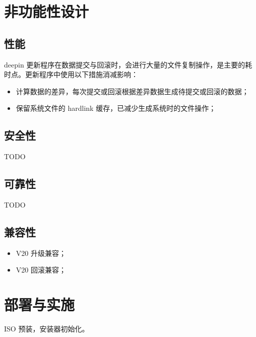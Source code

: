 \documentclass{utart}
\begin{document}
\section{非功能性设计}
\subsection{性能}
deepin 更新程序在数据提交与回滚时，会进行大量的文件复制操作，是主要的耗时点。更新程序中使用以下措施消减影响：
\begin{itemize}[leftmargin=4em]
\item 计算数据的差异，每次提交或回滚根据差异数据生成待提交或回滚的数据；
\item 保留系统文件的 hardlink 缓存，已减少生成系统时的文件操作；
\end{itemize}

\subsection{安全性}
TODO

\subsection{可靠性}
TODO

\subsection{兼容性}
\begin{itemize}[leftmargin=4em]
\item V20 升级兼容；
\item V20 回滚兼容；
\end{itemize}

\section{部署与实施}
ISO 预装，安装器初始化。
\end{document}
